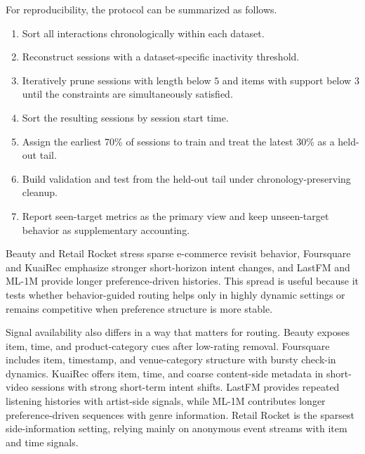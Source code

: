 \documentclass[sigconf,review,anonymous]{acmart}
\begin{document}
For reproducibility, the protocol can be summarized as follows.
\begin{enumerate}
  \item Sort all interactions chronologically within each dataset.
  \item Reconstruct sessions with a dataset-specific inactivity threshold.
  \item Iteratively prune sessions with length below $5$ and items with support below $3$ until the constraints are simultaneously satisfied.
  \item Sort the resulting sessions by session start time.
  \item Assign the earliest 70\% of sessions to train and treat the latest 30\% as a held-out tail.
  \item Build validation and test from the held-out tail under chronology-preserving cleanup.
  \item Report seen-target metrics as the primary view and keep unseen-target behavior as supplementary accounting.
\end{enumerate}

Beauty and Retail Rocket stress sparse e-commerce revisit behavior, Foursquare and KuaiRec emphasize stronger short-horizon intent changes, and LastFM and ML-1M provide longer preference-driven histories. This spread is useful because it tests whether behavior-guided routing helps only in highly dynamic settings or remains competitive when preference structure is more stable.

Signal availability also differs in a way that matters for routing. Beauty exposes item, time, and product-category cues after low-rating removal. Foursquare includes item, timestamp, and venue-category structure with bursty check-in dynamics. KuaiRec offers item, time, and coarse content-side metadata in short-video sessions with strong short-term intent shifts. LastFM provides repeated listening histories with artist-side signals, while ML-1M contributes longer preference-driven sequences with genre information. Retail Rocket is the sparsest side-information setting, relying mainly on anonymous event streams with item and time signals.
\end{document}
